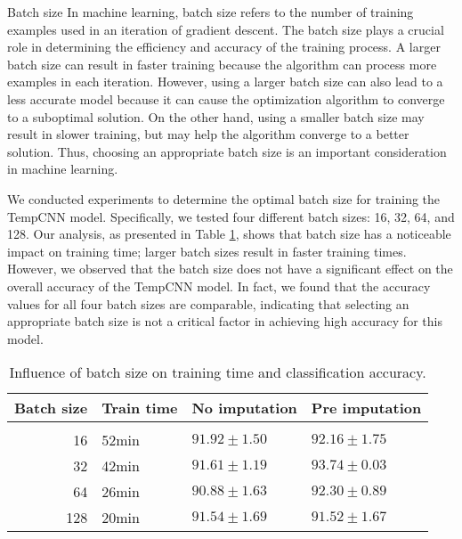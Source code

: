 \begin{paragraph}{Batch size}
In machine learning, batch size refers to the number of training examples used in an iteration of gradient descent.
The batch size plays a crucial role in determining the efficiency and accuracy of the training process.
A larger batch size can result in faster training because the algorithm can process more examples in each iteration.
However, using a larger batch size can also lead to a less accurate model because it can cause the optimization algorithm to converge to a suboptimal solution.
On the other hand, using a smaller batch size may result in slower training, but may help the algorithm converge to a better solution. 
Thus, choosing an appropriate batch size is an important consideration in machine learning.
\end{paragraph}

We conducted experiments to determine the optimal batch size for training the TempCNN model.
Specifically, we tested four different batch sizes: 16, 32, 64, and 128.
Our analysis, as presented in Table \ref{tab:temCNNbatchsize}, shows that batch size has a noticeable impact on training time; larger batch sizes result in faster training times.
However, we observed that the batch size does not have a significant effect on the overall accuracy of the TempCNN model.
In fact, we found that the accuracy values for all four batch sizes are comparable, indicating that selecting an appropriate batch size is not a critical factor in achieving high accuracy for this model.

\begin{table}[H]
  \centering
   \begin{tabular}{rlll}
   Batch size                 & Train time  & No imputation         & Pre imputation             \\[0.2cm]
   \hline \\[-0.2cm]
    16        & 52min  	 & $91.92 \pm 1.50$ 	 & $92.16 \pm 1.75$\\
    32        & 42min  	 & $\mathbf{91.61 \pm 1.19}$ 	 & $\mathbf{93.74 \pm 0.03}$\\
    64        & 26min  	 & $90.88 \pm 1.63$ 	 & $92.30 \pm 0.89$\\
    128       & 20min  	 & $91.54 \pm 1.69$ 	 & $91.52 \pm 1.67$\\
   \end{tabular}
   \caption{Influence of batch size on training time and classification accuracy.}
   \label{tab:temCNNbatchsize}
 \end{table}
 
